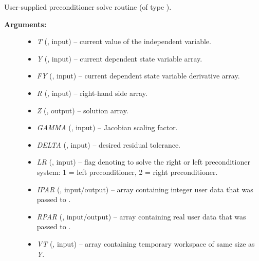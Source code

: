 \documentclass[letterpaper,10pt,english]{sphinxmanual}
\begin{document}
\begin{fulllineitems}
\label{f_interface/Usage:f/_/FARKPSOL}
User-supplied preconditioner solve routine (of type
{\hyperref[c_interface/User_supplied:ARKSpilsPrecSolveFn]{}}).
\begin{description}
\item[{\textbf{Arguments:}}] \leavevmode\begin{itemize}
\item {} 
\emph{T} (, input) -- current value of the independent variable.

\item {} 
\emph{Y} (, input) -- current dependent state variable array.

\item {} 
\emph{FY} (, input) -- current dependent state variable derivative array.

\item {} 
\emph{R} (, input) -- right-hand side array.

\item {} 
\emph{Z} (, output) -- solution array.

\item {} 
\emph{GAMMA} (, input) -- Jacobian scaling factor.

\item {} 
\emph{DELTA} (, input) -- desired residual tolerance.

\item {} 
\emph{LR} (, input) -- flag denoting to solve the right or left preconditioner
system: 1 = left preconditioner, 2 = right preconditioner.

\item {} 
\emph{IPAR} (, input/output) -- array containing integer user data that was passed to
{\hyperref[f_interface/Usage:f/_/FARKMALLOC]{}}.

\item {} 
\emph{RPAR} (, input/output) -- array containing real user data that was passed to
{\hyperref[f_interface/Usage:f/_/FARKMALLOC]{}}.

\item {} 
\emph{VT} (, input) -- array containing temporary workspace of same size as \emph{Y}.


\end{itemize}
\end{description}
\end{fulllineitems}
\end{document}
